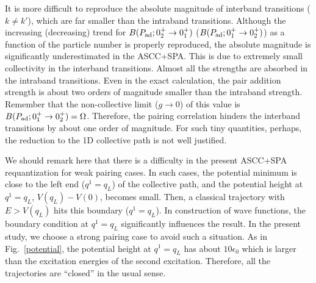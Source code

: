 \documentclass[11pt]{book} %
\begin{document}
It is more difficult to reproduce the absolute magnitude of
interband transitions ($k\neq k'$), 
which are far smaller than the intraband transitions.
Although the increasing (decreasing) trend for
$B(P_{\rm ad};0_2^+\rightarrow 0_1^+)$
($B(P_{\rm ad};0_1^+\rightarrow 0_2^+)$)
as a function of the particle number is properly reproduced,
the absolute magnitude is significantly underestimated in the ASCC+SPA.
This is due to extremely small collectivity in the interband transitions.
Almost all the strengths are absorbed in the intraband transitions.
Even in the exact calculation, the pair addition strength is
about two orders of magnitude smaller than the intraband strength.
Remember that the non-collective limit ($g\rightarrow 0$) of this
value is $B(P_{\rm ad};0_1^+\rightarrow 0_2^+)=\Omega$.
Therefore, the pairing correlation hinders the interband transitions
by about one order of magnitude.
For such tiny quantities, perhaps, 
the reduction to the 1D collective path is not well justified.



We should remark here that there is a difficulty in the present ASCC+SPA
requantization for weak pairing cases.
In such cases, the potential minimum is close to the left end 
($q^1=q_L$) of the collective path, and the potential height
at $q^1=q_L$, $V(q_L) - V(0)$, becomes small.
Then, a classical trajectory with $E>V(q_L)$ hits this boundary ($q^1=q_L$).
In construction of wave functions,
the boundary condition at $q^1=q_L$ significantly influences the result.
In the present study, we choose a strong pairing case to avoid
such a situation.
As in Fig.~\ref{potential}, the potential height at $q^1=q_L$ has
about $10\epsilon_0$ which is larger than the excitation energies
of the second excitation.
Therefore, all the trajectories are ``closed'' in the usual sense.
\end{document}
